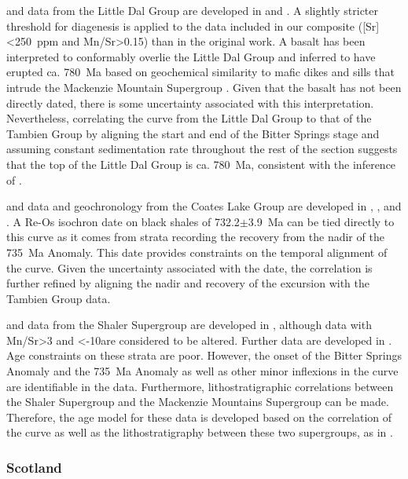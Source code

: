 \dC and \SrSr data from the Little Dal Group are developed in \citet{Halverson2006a} and \citet{Halverson2007b}. A slightly stricter threshold for \SrSr diagenesis is applied to the data included in our composite ([Sr]\textless250~ppm and Mn/Sr\textgreater0.15) than in the original work. A basalt has been interpreted to conformably overlie the Little Dal Group \citep{Aitken1981a} and inferred to have erupted ca. 780~Ma based on geochemical similarity to mafic dikes and sills that intrude the Mackenzie Mountain Supergroup \citep{Harlan2003a}. Given that the basalt has not been directly dated, there is some uncertainty associated with this interpretation. Nevertheless, correlating the \dC curve from the Little Dal Group to that of the Tambien Group by aligning the start and end of the Bitter Springs stage and assuming constant sedimentation rate throughout the rest of the section suggests that the top of the Little Dal Group is ca. 780~Ma, consistent with the inference of \citet{Harlan2003a}.

\dC and \SrSr data and geochronology from the Coates Lake Group are developed in \citet{Halverson2006a}, \citet{Halverson2007b}, and \citet{Rooney2014a}. A Re-Os isochron date on black shales of 732.2$\pm$3.9~Ma can be tied directly to this curve as it comes from strata recording the recovery from the nadir of the 735~Ma \dC Anomaly. This date provides constraints on the temporal alignment of the curve. Given the uncertainty associated with the date, the correlation is further refined by aligning the nadir and recovery of the excursion with the Tambien Group data.

\dC and \SrSr data from the Shaler Supergroup are developed in \citet{Asmerom1991a}, although \SrSr data with Mn/Sr\textgreater3 and \dO\textless-10\permil are considered to be altered. Further \dC data are developed in \citet{Jones2010a}. Age constraints on these strata are poor. However, the onset of the Bitter Springs Anomaly and the 735~Ma Anomaly as well as other minor inflexions in the \dC curve are identifiable in the data. Furthermore, lithostratigraphic correlations between the Shaler Supergroup and the Mackenzie Mountains Supergroup can be made. Therefore, the age model for these data is developed based on the correlation of the \dC curve as well as the lithostratigraphy between these two supergroups, as in \citet{Jones2010a}.

\subsubsection{Scotland}


